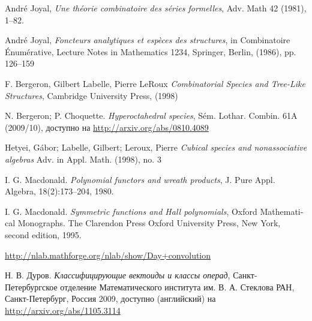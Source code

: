 \begin{thebibliography}{9}

 André Joyal, \emph{Une théorie combinatoire des séries
formelles}, Adv. Math 42 (1981), 1–82.

 André Joyal, \emph{Foncteurs analytiques et espèces des
structures}, in Combinatoire Énumérative, Lecture Notes in Mathematics 1234, Springer,
Berlin, (1986), pp. 126–159

 F. Bergeron, Gilbert Labelle, Pierre LeRoux
\emph{Combinatorial Species and Tree-Like Structures}, Cambridge University Press, (1998)

 N. Bergeron; P. Choquette.
\emph{Hyperoctahedral species}, Sém. Lothar. Combin. 61A (2009/10), доступно на
\url{http://arxiv.org/abs/0810.4089}

 Hetyei, Gábor; Labelle, Gilbert;
Leroux, Pierre \emph{Cubical species and nonassociative algebras} Adv. in Appl.
Math. (1998), no. 3

 I. G. Macdonald. \emph{Polynomial functors and wreath
products}, J. Pure Appl. Algebra, 18(2):173–204, 1980.

 I. G. Macdonald. \emph{Symmetric functions and Hall polynomials},
Oxford Mathemati- cal Monographs.
The Clarendon Press Oxford University Press, New York, second edition, 1995.

 \url{http://nlab.mathforge.org/nlab/show/Day+convolution}

 Н. В. Дуров. \emph{Классифицирующие вектоиды и классы операд},
Санкт-Петербургское отделение Математического института им. В. А. Стеклова РАН,
Санкт-Петербург, Россия 2009, доступно (английский) на
\url{http://arxiv.org/abs/1105.3114}

\end{thebibliography}